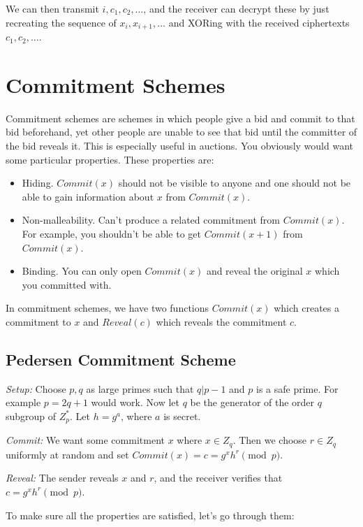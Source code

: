 \documentclass[psamsfonts]{amsart}
\begin{document}
We can then transmit $i, c_1, c_2, \ldots$, and the receiver can decrypt these by just recreating the sequence of $x_i, x_{i+1}, \ldots$ and XORing with the received ciphertexts $c_1, c_2, \ldots$.

\newpage

\section{Commitment Schemes}

Commitment schemes are schemes in which people give a bid and commit to that bid beforehand, yet other people are unable to see that bid until the committer of the bid reveals it. This is especially useful in auctions. You obviously would want some particular properties. These properties are:
\begin{itemize}
  \item Hiding. $Commit(x)$ should not be visible to anyone and one should not be able to gain information about $x$ from $Commit(x)$.
  \item Non-malleability. Can't produce a related commitment from $Commit(x)$. For example, you shouldn't be able to get $Commit(x+1)$ from $Commit(x)$.
  \item Binding. You can only open $Commit(x)$ and reveal the original $x$ which you committed with.
\end{itemize}

In commitment schemes, we have two functions $Commit(x)$ which creates a commitment to $x$ and $Reveal(c)$ which reveals the commitment $c$.

\subsection{Pedersen Commitment Scheme}

\emph{Setup:} Choose $p,q$ as large primes such that $q | p-1$ and $p$ is a safe prime. For example $p = 2q +1$ would work. Now let $q$ be the generator of the order $q$ subgroup of $Z_p^*$. Let $h = g^a$, where $a$ is secret.

\emph{Commit:} We want some commitment $x$ where $x \in Z_q$. Then we choose $r \in Z_q$ uniformly at random and set $Commit(x) = c = g^x h^r \pmod{p}$.

\emph{Reveal:} The sender reveals $x$ and $r$, and the receiver verifies that $c = g^x h^r \pmod{p}$.

To make sure all the properties are satisfied, let's go through them:
\end{document}
